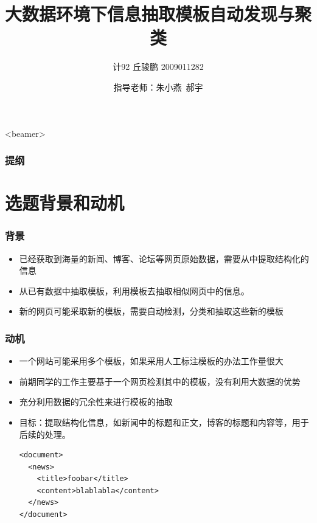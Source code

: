 \documentclass[11pt,presentation]{beamer}
\title{大数据环境下信息抽取模板自动发现与聚类}
\author{计92 丘骏鹏 2009011282}
\date{指导老师：朱小燕~郝宇}
\begin{document}
\maketitle



\begin{frame}<beamer>\frametitle{提纲}\tableofcontents\end{frame}
\section{选题背景和动机}
\label{sec-1}
\begin{frame}
\frametitle{背景}
\label{sec-1-1}

\begin{itemize}
\item 已经获取到海量的新闻、博客、论坛等网页原始数据，需要从中提取结构化的信息
\item 从已有数据中抽取模板，利用模板去抽取相似网页中的信息。
\item 新的网页可能采取新的模板，需要自动检测，分类和抽取这些新的模板
\end{itemize}
\end{frame}
\begin{frame}[fragile]
\frametitle{动机}
\label{sec-1-2}

\begin{itemize}
\item 一个网站可能采用多个模板，如果采用人工标注模板的办法工作量很大
\item 前期同学的工作主要基于一个网页检测其中的模板，没有利用大数据的优势
\item 充分利用数据的冗余性来进行模板的抽取
\item 目标：提取结构化信息，如新闻中的标题和正文，博客的标题和内容等，用于后续的处理。
  \tiny

\lstset{extendedchars=false,basicstyle=\ttfamily\footnotesize,escapechar=`,breaklines,language=nxml}
\begin{lstlisting}
<document>
  <news>
    <title>foobar</title>
    <content>blablabla</content>
  </news>
</document>
\end{lstlisting}
\end{itemize}
\end{frame}
\end{document}
